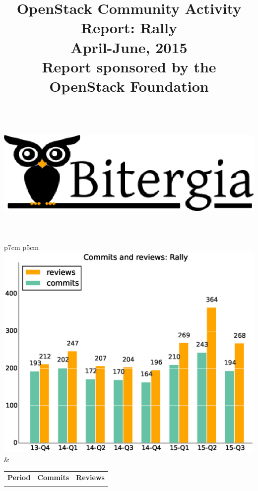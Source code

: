 \documentclass[a4wide,11pt]{article}
\begin{document}
\title{OpenStack Community Activity Report: Rally\\
      April-June, 2015 \\
      Report sponsored by the OpenStack Foundation\\
        ~~\\~~\\  \includegraphics[scale=.35]{logo.eps}       \\}




\maketitle

\newpage



\begin{tabular}{p{7cm} p{5cm}}
    \vspace{0pt} 
    \includegraphics[scale=.35]{figs/commitsRally.eps}
    & 
    \vspace{0pt}
    \begin{tabular}{l|r|r|}%
    \bfseries Period & \bfseries Commits & \bfseries Reviews %
    \csvreader[head to column names]{data/commitsRally.csv}{}%
    {\\ & \commits & \submitted}
    \end{tabular}
\end{tabular}
\end{document}
